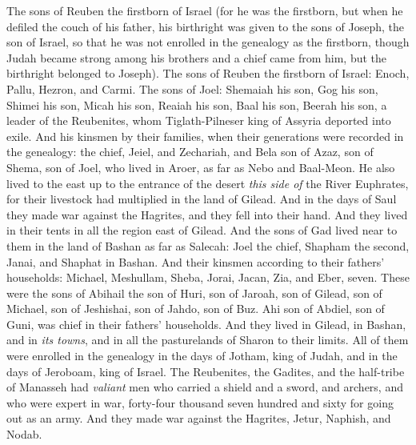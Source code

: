 \begin{biblechapter} %
 The sons of Reuben the firstborn of Israel (for he was the firstborn, but when he defiled the couch of his father, his birthright was given to the sons of Joseph, the son of Israel, so that he was not enrolled in the genealogy as the firstborn,
\verse though Judah became strong among his brothers and a chief came from him, but the birthright belonged to Joseph).
\verse The sons of Reuben the firstborn of Israel: Enoch, Pallu, Hezron, and Carmi.
\verse The sons of Joel: Shemaiah his son, Gog his son, Shimei his son,
\verse Micah his son, Reaiah his son, Baal his son,
\verse Beerah his son, a leader of the Reubenites, whom Tiglath-Pilneser king of Assyria deported into exile.
\verse And his kinsmen by their families, when their generations were recorded in the genealogy: the chief, Jeiel, and Zechariah,
\verse and Bela son of Azaz, son of Shema, son of Joel, who lived in Aroer, as far as Nebo and Baal-Meon.
\verse He also lived to the east up to the entrance of the desert \textit{this side of} the River Euphrates, for their livestock had multiplied in the land of Gilead.
\verse And in the days of Saul they made war against the Hagrites, and they fell into their hand. And they lived in their tents in all the region east of Gilead.
 And the sons of Gad lived near to them in the land of Bashan as far as Salecah:
\verse Joel the chief, Shapham the second, Janai, and Shaphat in Bashan.
\verse And their kinsmen according to their fathers’ households: Michael, Meshullam, Sheba, Jorai, Jacan, Zia, and Eber, seven.
\verse These were the sons of Abihail the son of Huri, son of Jaroah, son of Gilead, son of Michael, son of Jeshishai, son of Jahdo, son of Buz.
\verse Ahi son of Abdiel, son of Guni, was chief in their fathers’ households.
\verse And they lived in Gilead, in Bashan, and in \textit{its towns}, and in all the pasturelands of Sharon to their limits.
\verse All of them were enrolled in the genealogy in the days of Jotham, king of Judah, and in the days of Jeroboam, king of Israel.
\verse The Reubenites, the Gadites, and the half-tribe of Manasseh had \textit{valiant} men who carried a shield and a sword, and archers, and who were expert in war, forty-four thousand seven hundred and sixty for going out as an army.
\verse And they made war against the Hagrites, Jetur, Naphish, and Nodab.

\end{biblechapter}
